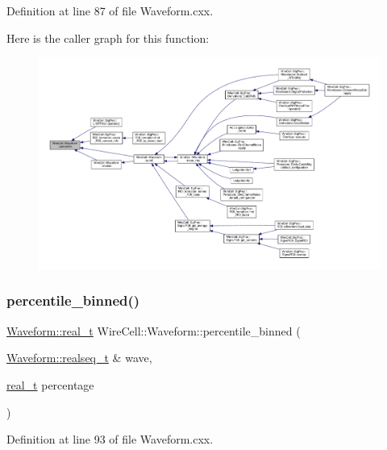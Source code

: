 Definition at line 87 of file Waveform.\+cxx.

Here is the caller graph for this function\+:
\nopagebreak
\begin{figure}[H]
\begin{center}
\leavevmode
\includegraphics[width=350pt]{namespace_wire_cell_1_1_waveform_a9116b8ebe848721a04d5100fa672b0aa_icgraph}
\end{center}
\end{figure}
\mbox{\label{namespace_wire_cell_1_1_waveform_ae080d239c8b4426a6d74f9fd8ce85f1a}} 
\subsubsection{\texorpdfstring{percentile\+\_\+binned()}{percentile\_binned()}}
{\footnotesize\ttfamily \hyperlink{namespace_wire_cell_1_1_waveform_a47570354e4599d8387803188186aba1f}{Waveform\+::real\+\_\+t} Wire\+Cell\+::\+Waveform\+::percentile\+\_\+binned (\begin{DoxyParamCaption}\item[{\hyperlink{namespace_wire_cell_1_1_waveform_a479175e541c8545e87cd8063b74b6956}{Waveform\+::realseq\+\_\+t} \&}]{wave,  }\item[{\hyperlink{namespace_wire_cell_1_1_waveform_a47570354e4599d8387803188186aba1f}{real\+\_\+t}}]{percentage }\end{DoxyParamCaption})}



Definition at line 93 of file Waveform.\+cxx.

